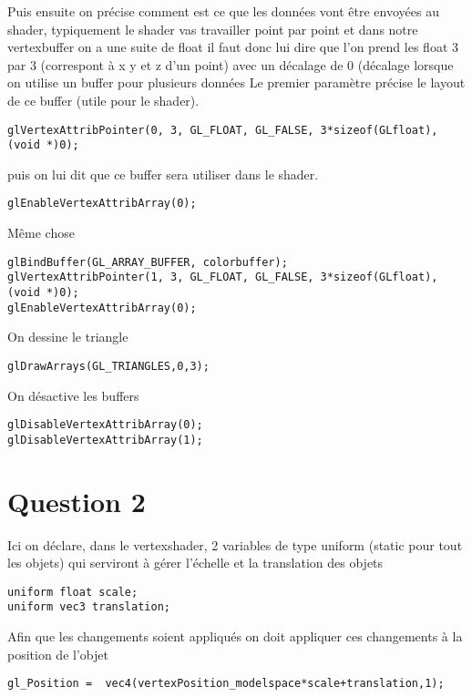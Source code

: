 \documentclass{article}
\begin{document}
Puis ensuite on précise comment est ce que les données vont être envoyées au shader, typiquement le shader vas travailler point par point et dans notre vertexbuffer on a une suite de float il faut donc lui dire que l’on prend les float 3 par 3 (correspont à x y et z d’un point) avec un décalage de 0 (décalage lorsque on utilise un buffer pour plusieurs données
Le premier paramètre précise le layout de ce buffer (utile pour le shader).


\begin{lstlisting}
glVertexAttribPointer(0, 3, GL_FLOAT, GL_FALSE, 3*sizeof(GLfloat), (void *)0);
\end{lstlisting}

puis on lui dit que ce buffer sera utiliser dans le shader.

\begin{lstlisting}
glEnableVertexAttribArray(0);
\end{lstlisting}
\newpage

Même chose
\begin{lstlisting}
glBindBuffer(GL_ARRAY_BUFFER, colorbuffer);
glVertexAttribPointer(1, 3, GL_FLOAT, GL_FALSE, 3*sizeof(GLfloat), (void *)0);
glEnableVertexAttribArray(0);
\end{lstlisting}
On dessine le triangle
\begin{lstlisting}
glDrawArrays(GL_TRIANGLES,0,3);
\end{lstlisting}
On désactive les buffers
\begin{lstlisting}
glDisableVertexAttribArray(0);
glDisableVertexAttribArray(1);
\end{lstlisting}


\newpage
\section{Question 2}

Ici on déclare, dans le vertexshader, 2 variables de type uniform (static pour tout les objets) qui serviront à gérer l’échelle et la translation des objets
\begin{lstlisting}
uniform float scale;
uniform vec3 translation;
\end{lstlisting}



Afin que les changements soient appliqués on doit appliquer ces changements à la position de l’objet
\begin{lstlisting}
gl_Position =  vec4(vertexPosition_modelspace*scale+translation,1);
\end{lstlisting}
\end{document}
